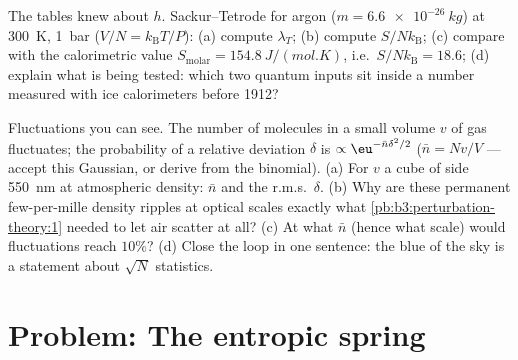 \begin{exercise}[$\star\star\star$]\label{exo:b3:microcanonical-ensemble:11}
The tables knew about $h$. Sackur--Tetrode for argon ($m =
\qty{6.6e-26}{kg}$) at \qty{300}{K}, \qty{1}{bar} ($V/N =
k_{\text{B}}T/P$): (a) compute $\lambda_T$; (b) compute $S/N
k_{\text{B}}$; (c) compare with the calorimetric value
$S_{\text{molar}} = \qty{154.8}{J/(mol.K)}$, i.e.\ $S/Nk_{\text{B}}
= 18.6$; (d) explain what is being tested: which two quantum
inputs sit inside a number measured with ice calorimeters before
1912?
\end{exercise}

\begin{exercise}[$\star\star\star$]\label{exo:b3:microcanonical-ensemble:12}
Fluctuations you can see. The number of molecules in a small volume
$v$ of gas fluctuates; the probability of a relative deviation
$\delta$ is $\propto\eu^{-\bar n\delta^2/2}$ ($\bar n = Nv/V$ ---
accept this Gaussian, or derive from the binomial). (a) For $v$ a
cube of side \qty{550}{nm} at atmospheric density: $\bar n$ and
the r.m.s.\ $\delta$. (b) Why are these permanent few-per-mille
density ripples at optical scales exactly what
\cref{pb:b3:perturbation-theory:1} needed to let air scatter at
all? (c) At what $\bar n$ (hence what scale) would fluctuations
reach $10\%$? (d) Close the loop in one sentence: the blue of the
sky is a statement about $\sqrt N$ statistics.
\end{exercise}

\section{Problem: The entropic spring}

